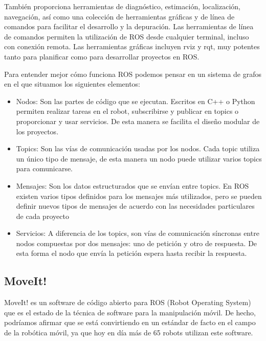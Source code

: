 También proporciona herramientas de diagnóstico, estimación, localización, navegación, así como una colección de herramientas gráficas y de línea de comandos para facilitar el desarrollo y la depuración. Las herramientas de línea de comandos permiten la utilización de ROS desde cualquier terminal, incluso con conexión remota. Las herramientas gráficas incluyen rviz y rqt, muy potentes tanto para planificar como para desarrollar proyectos en ROS.

Para entender mejor cómo funciona ROS podemos pensar en un sistema de grafos en el que situamos los siguientes elementos:

\begin{itemize}
	\item Nodos: Son las partes de código que se ejecutan. Escritos en C++ o Python permiten realizar tareas en el robot, subscribirse y publicar en topics o proporcionar y usar servicios. De esta manera se facilita el diseño modular de los proyectos.

	\item Topics: Son las vías de comunicación usadas por los nodos. Cada topic utiliza un único tipo de mensaje, de esta manera un nodo puede utilizar varios topics para comunicarse.

	\item Mensajes: Son los datos estructurados que se envían entre topics. En ROS existen varios tipos definidos para los mensajes más utilizados, pero se pueden definir nuevos tipos de mensajes de acuerdo con las necesidades particulares de cada proyecto

	\item Servicios: A diferencia de los topics, son vías de comunicación síncronas entre nodos compuestas por dos mensajes: uno de petición y otro de respuesta. De esta forma  el nodo que envía la petición espera hasta recibir la respuesta.
\end{itemize}

\subsection{MoveIt!}
\label{subsec:inf_moveit}

MoveIt!\cite{moveit}  es un software de código abierto para ROS (Robot Operating System) que es el estado de la técnica de software para la manipulación móvil. De hecho, podríamos afirmar que se está convirtiendo en un estándar de facto en el campo de la robótica móvil, ya que hoy en día más de 65 robots utilizan este software.

